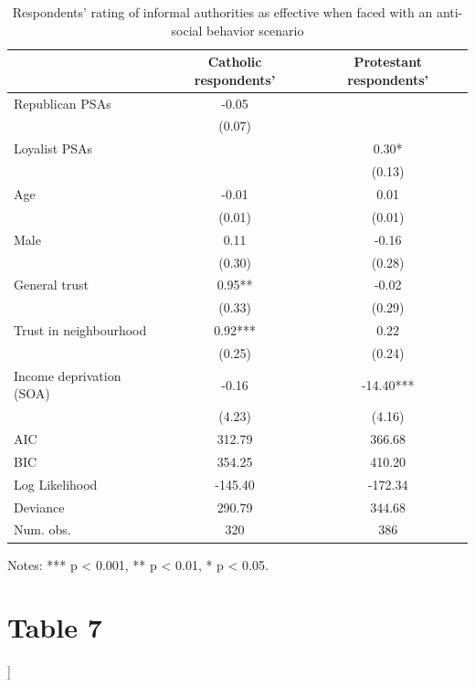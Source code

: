 \documentclass[12pt,letterpaper]{article}
\begin{document}
	\begin{table}[htbp]
		\centering
		\caption{Respondents' rating of informal authorities as effective when faced with an anti-social behavior scenario}
		\begin{tabular}{lcc}
			\toprule
			& \textbf{Catholic respondents'} & \textbf{Protestant respondents'} \\
			\midrule
			Republican PSAs             & -0.05 & \\
			& (0.07) & \\
			Loyalist PSAs               & & 0.30* \\
			& & (0.13) \\
			Age                         & -0.01 & 0.01 \\
			& (0.01) & (0.01) \\
			Male                        & 0.11 & -0.16 \\
			& (0.30) & (0.28) \\
			General trust               & 0.95** & -0.02 \\
			& (0.33) & (0.29) \\
			Trust in neighbourhood     & 0.92*** & 0.22 \\
			& (0.25) & (0.24) \\
			Income deprivation (SOA)   & -0.16 & -14.40*** \\
			& (4.23) & (4.16) \\
			\midrule
			AIC                         & 312.79 & 366.68 \\
			BIC                         & 354.25 & 410.20 \\
			Log Likelihood              & -145.40 & -172.34 \\
			Deviance                    & 290.79 & 344.68 \\
			Num. obs.                   & 320 & 386 \\
			\bottomrule
		\end{tabular}
		\label{tab:informal_authorities}
		\medskip
		\small
		\raggedright
		Notes: *** p < 0.001, ** p < 0.01, * p < 0.05.
	\end{table}
	\newpage
	\section*{Table 7}
		]
	
\end{document}
